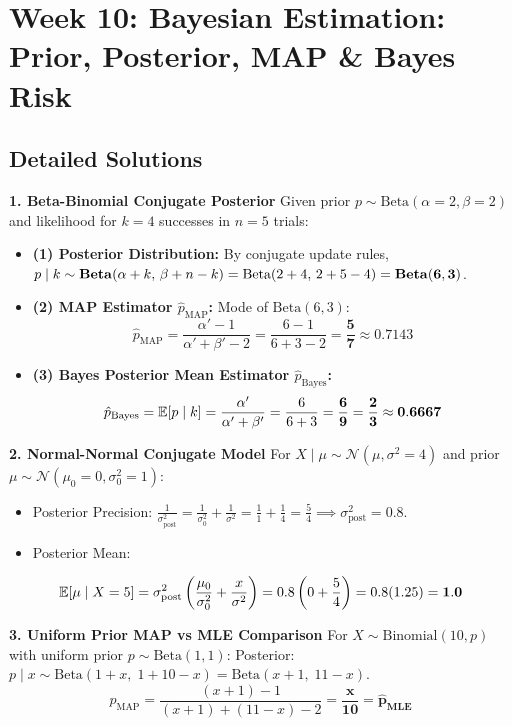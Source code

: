 \section*{Week 10: Bayesian Estimation: Prior, Posterior, MAP \& Bayes Risk}

\subsection*{Detailed Solutions}

\textbf{1. Beta-Binomial Conjugate Posterior}
Given prior $p \sim \text{Beta}(\alpha = 2, \beta = 2)$ and likelihood for $k = 4$ successes in $n = 5$ trials:
\begin{itemize}
    \item \textbf{(1) Posterior Distribution:}
    By conjugate update rules, $p \mid k \sim \text{\textbf{Beta}}(\alpha + k, \, \beta + n - k) = \text{Beta}(2+4, \, 2+5-4) = \mathbf{\text{\textbf{Beta}}(6, 3)}$.
    \item \textbf{(2) MAP Estimator $\hat{p}_{\text{MAP}}$:}
    Mode of $\text{Beta}(6, 3)$:
    $$\hat{p}_{\text{MAP}} = \frac{\alpha' - 1}{\alpha' + \beta' - 2} = \frac{6 - 1}{6 + 3 - 2} = \mathbf{\frac{5}{7} \approx 0.7143}$$
    \item \textbf{(3) Bayes Posterior Mean Estimator $\hat{p}_{\text{Bayes}}$:}
    $$\hat{p}_{\text{Bayes}} = \mathbb{E}[p \mid k] = \frac{\alpha'}{\alpha' + \beta'} = \frac{6}{6 + 3} = \mathbf{\frac{6}{9} = \frac{2}{3} \approx 0.6667}$$
\end{itemize}

\textbf{2. Normal-Normal Conjugate Model}
For $X \mid \mu \sim \mathcal{N}(\mu, \sigma^2 = 4)$ and prior $\mu \sim \mathcal{N}(\mu_0 = 0, \sigma_0^2 = 1)$:
\begin{itemize}
    \item Posterior Precision: $\frac{1}{\sigma_{\text{post}}^2} = \frac{1}{\sigma_0^2} + \frac{1}{\sigma^2} = \frac{1}{1} + \frac{1}{4} = \frac{5}{4} \implies \sigma_{\text{post}}^2 = 0.8$.
    \item Posterior Mean:
\end{itemize}
$$\mathbb{E}[\mu \mid X = 5] = \sigma_{\text{post}}^2 \left( \frac{\mu_0}{\sigma_0^2} + \frac{x}{\sigma^2} \right) = 0.8 \left( 0 + \frac{5}{4} \right) = 0.8(1.25) = \mathbf{1.0}$$

\textbf{3. Uniform Prior MAP vs MLE Comparison}
For $X \sim \text{Binomial}(10, p)$ with uniform prior $p \sim \text{Beta}(1, 1)$:
Posterior: $p \mid x \sim \text{Beta}(1 + x, \; 1 + 10 - x) = \text{Beta}(x + 1, \; 11 - x)$.
$$\hat{p}_{\text{MAP}} = \frac{(x + 1) - 1}{(x + 1) + (11 - x) - 2} = \mathbf{\frac{x}{10} = \hat{p}_{\text{MLE}}}$$


